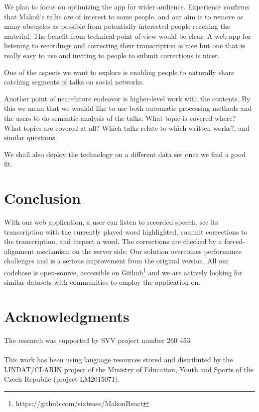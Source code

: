 \documentclass{svproc}
\begin{document}
We plan to focus on optimizing the app for wider audience. Experience confirms
that Mako\v{n}'s talks are of interest to some people, and our aim is to
remove as many obstacles as possible from potentially interested people reaching
the material. The benefit from technical point of view would be clear: A web app
for listening to recordings and correcting their transcription is nice but one
that is really easy to use and inviting to people to submit corrections is nicer.

One of the aspects we want to explore is enabling people to naturally share
catching segments of talks on social networks.

Another point of near-future endeavor is higher-level work with the contents. By
this we mean that we wouldd like to use both automatic processing methods and the
users to do semantic analysis of the talks: What topic is covered where? What
topics are covered at all? Which talks relate to which written works?, and
similar questions.

We shall also deploy the technology on a different data set once we find a good
fit.

\section{Conclusion}

With our web application, a user can listen to recorded speech, see its
transcription with the currently played word highlighted, commit corrections to
the transcription, and inspect a word. The corrections are checked by a
forced-alignment mechanism on the server side. Our solution overcomes
performance challenges and is a serious improvement from the original version.
All our codebase is open-source, accessible on
Github\footnote{https://github.com/sixtease/MakonReact} and we are actively
looking for similar datasets with communities to employ the application on.

\section*{Acknowledgments}

The research was supported by SVV project number 260 453.\\
\\
This work has been using language resources stored
and distributed  by the LINDAT/CLARIN project of the Ministry of Education,
Youth and Sports of the Czech Republic (project LM2015071).



\end{document}
